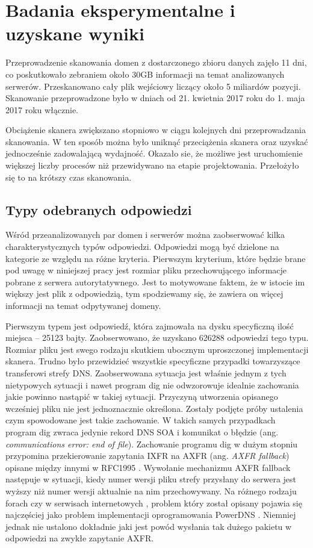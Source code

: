 \chapter{Badania eksperymentalne i uzyskane wyniki}
Przeprowadzenie skanowania domen z dostarczonego zbioru danych zajęło 11 dni, co poskutkowało zebraniem około 30GB informacji na
temat analizowanych serwerów. Przeskanowano cały plik wejściowy liczący około 5 miliardów pozycji. Skanowanie przeprowadzone było
w dniach od 21. kwietnia 2017 roku do 1. maja 2017 roku włącznie.

Obciążenie skanera zwiększano stopniowo w ciągu kolejnych dni przeprowadzania skanowania. W ten sposób można było uniknąć przeciążenia
skanera oraz uzyskać jednocześnie zadowalającą wydajność. Okazało sie, że możliwe jest uruchomienie większej liczby procesów niż
przewidywano na etapie projektowania. Przełożyło się to na krótszy czas skanowania.

\section{Typy odebranych odpowiedzi}\label{sec:typy}
Wśród przeanalizowanych par domen i serwerów można zaobserwować kilka charakterystycznych typów odpowiedzi. Odpowiedzi mogą być
dzielone na kategorie ze względu na różne kryteria. Pierwszym kryterium, które będzie brane pod uwagę w niniejszej pracy jest
rozmiar pliku przechowującego informacje pobrane z serwera autorytatywnego. Jest to motywowane faktem, że w istocie im większy
jest plik z odpowiedzią, tym spodziewamy się, że zawiera on więcej informacji na temat odpytywanej domeny.

Pierwszym typem jest odpowiedź, która zajmowała na dysku specyficzną ilość miejsca -- 25123 bajty. Zaobserwowano, że uzyskano
626288 odpowiedzi tego typu. Rozmiar pliku jest swego rodzaju skutkiem ubocznym uproszczonej implementacji skanera. Trudno było
przewidzieć wszystkie specyficzne przypadki towarzyszące transferowi strefy DNS. Zaobserwowana sytuacja jest właśnie jednym z
tych nietypowych sytuacji i nawet program dig nie odwzorowuje idealnie zachowania jakie powinno nastąpić w takiej sytuacji.
Przyczyną utworzenia opisanego wcześniej pliku nie jest jednoznacznie określona. Zostały podjęte próby ustalenia czym spowodowane
	jest takie zachowanie. W takich samych przypadkach program dig zwraca jedynie rekord DNS SOA i komunikat o błędzie (ang.
\textit{communications error: end of file}). Zachowanie programu dig w dużym stopniu przypomina przekierowanie zapytania IXFR na
AXFR (ang. \textit{AXFR fallback}) opisane między innymi w RFC1995 \cite{RFC1995}. Wywołanie mechanizmu AXFR fallback następuje
w sytuacji, kiedy numer wersji pliku strefy przysłany do serwera jest wyższy niż numer wersji aktualnie na nim przechowywany.
Na różnego rodzaju forach \cite{powerdns-forum} czy w serwisach internetowych \cite{powerdns-git}, problem który został opisany
pojawia się najczęściej jako problem implementacji oprogramowania PowerDNS \cite{powerdns}. Niemniej jednak nie ustalono dokładnie
jaki jest powód wysłania tak dużego pakietu w odpowiedzi na zwykłe zapytanie AXFR.

